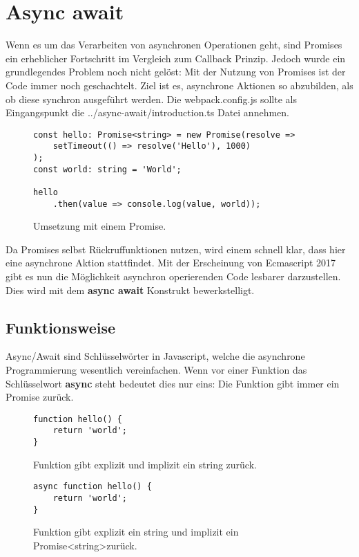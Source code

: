 \section{Async await}
Wenn es um das Verarbeiten von asynchronen Operationen geht, sind Promises ein erheblicher Fortschritt im Vergleich zum Callback Prinzip. Jedoch wurde ein grundlegendes Problem noch nicht gelöst: Mit der Nutzung von Promises ist der Code immer noch geschachtelt. Ziel ist es, asynchrone Aktionen so abzubilden, als ob diese synchron ausgeführt werden. Die webpack.config.js sollte als Eingangspunkt die ../async-await/introduction.ts Datei annehmen.

\begin{figure}[H]
\begin{lstlisting}[basicstyle=\small]
const hello: Promise<string> = new Promise(resolve =>
    setTimeout(() => resolve('Hello'), 1000)
);
const world: string = 'World';

hello
    .then(value => console.log(value, world));
\end{lstlisting}
\caption{Umsetzung mit einem Promise.}
\label{Promise-comparison-async-await}
\end{figure}

\noindent
Da Promises selbst Rückruffunktionen nutzen, wird einem schnell klar, dass hier eine asynchrone Aktion stattfindet. Mit der Erscheinung von Ecmascript 2017 gibt es nun die Möglichkeit asynchron operierenden Code lesbarer darzustellen. Dies wird mit dem \textbf{async await} Konstrukt bewerkstelligt. 

\subsection{Funktionsweise}

Async/Await sind Schlüsselwörter in Javascript, welche die asynchrone Programmierung wesentlich vereinfachen. Wenn vor einer Funktion das Schlüsselwort \textbf{async} steht bedeutet dies nur eins: Die Funktion gibt immer ein Promise zurück.

\begin{figure}[H]
\begin{lstlisting}[basicstyle=\small]
function hello() {
    return 'world';
}
\end{lstlisting}
\caption{Funktion gibt explizit und implizit ein string zurück.}
\end{figure}

\begin{figure}[H]
\begin{lstlisting}[basicstyle=\small]
async function hello() {
    return 'world';
}
\end{lstlisting}
\caption{Funktion gibt explizit ein string und implizit ein Promise\textless string\textgreater zurück.}
\end{figure}

